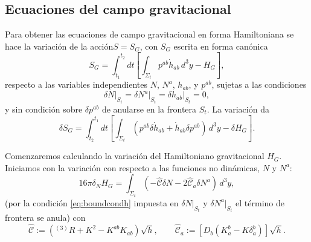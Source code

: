 
\subsection{Ecuaciones del campo gravitacional}

Para obtener las ecuaciones de campo gravitacional en forma Hamiltoniana se hace la variaci\'{o}n de la acci\'{o}n\footnotemark $S = S_{G}$, con $S_{G}$ escrita en forma can\'{o}nica
%
\begin{equation}
S_{G} = \int^{t_2}_{t_1} dt \left[ \int_{\Sigma_{t}} p^{ab} \dot{h}_{ab} \, d^{3} y - H_{G} \right],
\end{equation}
%
respecto a las variables independientes $N$, $N^{a}$, $h_{ab}$, y $p^{ab}$, sujetas a las condiciones
%
\begin{equation}
\label{eq:boundcondh}
\delta N \Big|_{S_{t}} = \delta N^{a} \Big|_{S_{t}} = \delta h_{ab} \Big|_{S_{t}} = 0,
\end{equation}
%
y sin condici\'{o}n sobre $\delta p^{ab}$ de anularse en la frontera $S_{t}$. La variaci\'{o}n da
%
\begin{equation}
\label{eq:varSG31}
\delta S_{G} = \int^{t_1}_{t_2} dt \left[ \int_{\Sigma_{t}} (p^{ab} \delta \dot{h}_{ab} + \dot{h}_{ab} \delta p^{ab}) \, d^{3} y - \delta H_{G} \right].
\end{equation}

Comenzaremos calculando la variaci\'{o}n del Hamiltoniano gravitacional $H_{G}$. Iniciamos con la variaci\'{o}n con respecto a las funciones no din\'{a}micas, $N$ y $N^{a}$:
%
\begin{equation}
\label{eq:varHcrNNa}
16 \pi \delta_{N} H_{G} = \int_{\Sigma_{t}} (- \hat{\mathcal{C}} \delta N - 2 \hat{\mathcal{C}}_{a} \delta N^{a}) \, d^{3} y,
\end{equation}
%
(por la condición \eqref{eq:boundcondh} impuesta en $\delta N \Big|_{S_{t}}$ y $\delta N^{a} \Big|_{S_{t}}$ el t\'{e}rmino de frontera se anula) con
%
\begin{equation}
\hat{\mathcal{C}} := (^{(3)}R + K^{2} - K^{ab} K_{ab}) \sqrt{h}, \qquad \hat{\mathcal{C}}_{a} := [D_{b} (K_{a}^{b} - K \delta_{a}^{b})] \sqrt{h}.
\end{equation}

